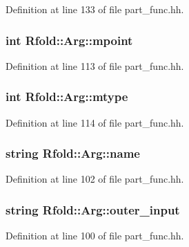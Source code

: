 Definition at line 133 of file part\+\_\+func.\+hh.

\hypertarget{class_rfold_1_1_arg_a273269902f8a9b9974c1d46800df16e9}{
\subsubsection[{mpoint}]{\setlength{\rightskip}{0pt plus 5cm}int Rfold\+::\+Arg\+::mpoint}}\label{class_rfold_1_1_arg_a273269902f8a9b9974c1d46800df16e9}


Definition at line 113 of file part\+\_\+func.\+hh.

\hypertarget{class_rfold_1_1_arg_a9736867f9aac222c47efa0b5218fc8fa}{
\subsubsection[{mtype}]{\setlength{\rightskip}{0pt plus 5cm}int Rfold\+::\+Arg\+::mtype}}\label{class_rfold_1_1_arg_a9736867f9aac222c47efa0b5218fc8fa}


Definition at line 114 of file part\+\_\+func.\+hh.

\hypertarget{class_rfold_1_1_arg_a38ab74cced49339e67fe8f70bb6827fb}{
\subsubsection[{name}]{\setlength{\rightskip}{0pt plus 5cm}string Rfold\+::\+Arg\+::name}}\label{class_rfold_1_1_arg_a38ab74cced49339e67fe8f70bb6827fb}


Definition at line 102 of file part\+\_\+func.\+hh.

\hypertarget{class_rfold_1_1_arg_ae62e02353945f6073c46c27c7f583649}{
\subsubsection[{outer\+\_\+input}]{\setlength{\rightskip}{0pt plus 5cm}string Rfold\+::\+Arg\+::outer\+\_\+input}}\label{class_rfold_1_1_arg_ae62e02353945f6073c46c27c7f583649}


Definition at line 100 of file part\+\_\+func.\+hh.

